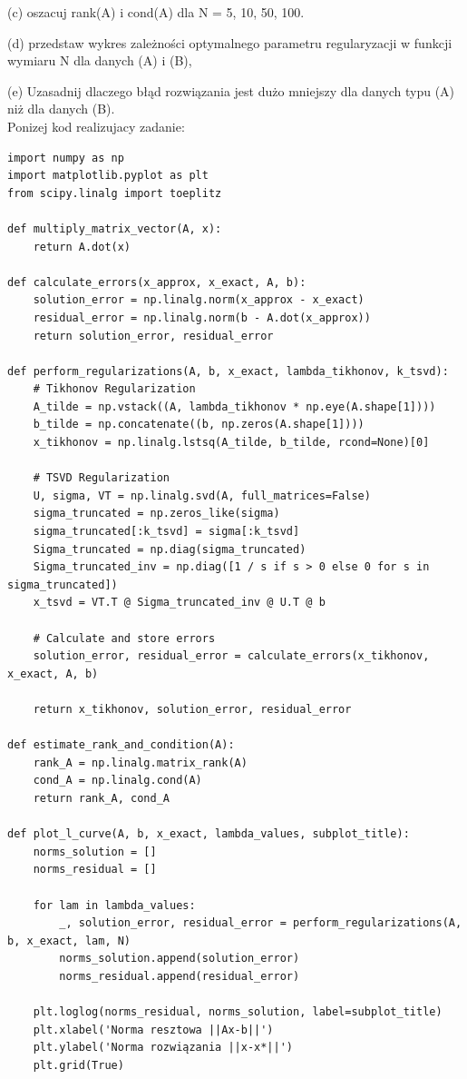 \documentclass{article}
\begin{document}
(c) oszacuj rank(A) i cond(A) dla N = 5, 10, 50, 100.

(d) przedstaw wykres zależności optymalnego parametru regularyzacji w funkcji wymiaru
N dla danych (A) i (B),

(e) Uzasadnij dlaczego błąd rozwiązania jest dużo mniejszy dla danych typu (A) niż dla
danych (B).\\

Ponizej kod realizujacy zadanie:

\begin{lstlisting}
import numpy as np
import matplotlib.pyplot as plt
from scipy.linalg import toeplitz

def multiply_matrix_vector(A, x):
    return A.dot(x)

def calculate_errors(x_approx, x_exact, A, b):
    solution_error = np.linalg.norm(x_approx - x_exact)
    residual_error = np.linalg.norm(b - A.dot(x_approx))
    return solution_error, residual_error

def perform_regularizations(A, b, x_exact, lambda_tikhonov, k_tsvd):
    # Tikhonov Regularization
    A_tilde = np.vstack((A, lambda_tikhonov * np.eye(A.shape[1])))
    b_tilde = np.concatenate((b, np.zeros(A.shape[1])))
    x_tikhonov = np.linalg.lstsq(A_tilde, b_tilde, rcond=None)[0]

    # TSVD Regularization
    U, sigma, VT = np.linalg.svd(A, full_matrices=False)
    sigma_truncated = np.zeros_like(sigma)
    sigma_truncated[:k_tsvd] = sigma[:k_tsvd]
    Sigma_truncated = np.diag(sigma_truncated)
    Sigma_truncated_inv = np.diag([1 / s if s > 0 else 0 for s in sigma_truncated])
    x_tsvd = VT.T @ Sigma_truncated_inv @ U.T @ b

    # Calculate and store errors
    solution_error, residual_error = calculate_errors(x_tikhonov, x_exact, A, b)

    return x_tikhonov, solution_error, residual_error

def estimate_rank_and_condition(A):
    rank_A = np.linalg.matrix_rank(A)
    cond_A = np.linalg.cond(A)
    return rank_A, cond_A

def plot_l_curve(A, b, x_exact, lambda_values, subplot_title):
    norms_solution = []
    norms_residual = []

    for lam in lambda_values:
        _, solution_error, residual_error = perform_regularizations(A, b, x_exact, lam, N)
        norms_solution.append(solution_error)
        norms_residual.append(residual_error)

    plt.loglog(norms_residual, norms_solution, label=subplot_title)
    plt.xlabel('Norma resztowa ||Ax-b||')
    plt.ylabel('Norma rozwiązania ||x-x*||')
    plt.grid(True)


\end{lstlisting}
\end{document}
